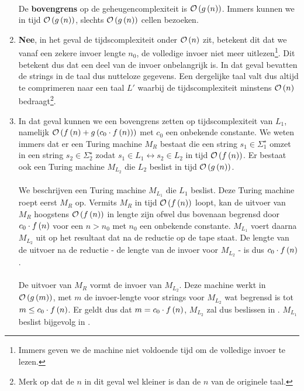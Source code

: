 \documentclass{article}
\begin{document}
\begin{question}[Complexiteitstheorie]
\begin{answer}
\begin{enumerate}
 \paragraph{}
 De \textbf{bovengrens} op de geheugencomplexiteit is $\mathcal{O}\left( g\left( n \right) \right)$. Immers kunnen we in tijd $\mathcal{O}\left( g\left( n \right) \right)$, slechts $\mathcal{O}\left( g\left( n \right) \right)$
 cellen bezoeken.
 \item \textbf{Nee}, in het geval de tijdscomplexiteit onder $\mathcal{O}\left( n \right)$ zit,
 betekent dit dat we vanaf een zekere invoer lengte $n_0$, de volledige invoer niet meer
 uitlezen\footnote{Immers geven we de machine niet voldoende tijd om de volledige invoer te lezen.}.
 Dit betekent dus dat een deel van de invoer onbelangrijk is. In dat geval bevatten de strings in de taal dus nutteloze gegevens.
 Een dergelijke taal valt dus altijd te comprimeren naar een taal $L'$ waarbij de tijdscomplexiteit minstens
 $\mathcal{O}\left( n \right)$ bedraagt\footnote{Merk op dat de $n$ in dit geval wel kleiner is dan de $n$ van de originele taal.}.
 \item In dat geval kunnen we een bovengrens zetten op tijdscomplexiteit van $L_1$,
 namelijk $\mathcal{O}\left( f\left( n \right)+g\left( c_0\cdot f\left( n \right) \right) \right)$ met $c_0$ een onbekende constante.
 We weten immers dat er een Turing machine $M_R$ bestaat die een string $s_1\in\Sigma_1^{\star}$ omzet
 in een string $s_2\in\Sigma_2^{\star}$ zodat $s_1\in L_1\leftrightarrow s_2\in L_2$ in tijd $\mathcal{O}\left( f\left( n \right) \right)$.
 Er bestaat ook een Turing machine $M_{L_2}$ die $L_2$ beslist in tijd $\mathcal{O}\left( g\left( n \right) \right)$.
 \paragraph{}
 We beschrijven een Turing machine $M_{L_1}$ die $L_1$ beslist. Deze Turing machine roept eerst $M_R$ op.
 Vermits $M_R$ in tijd $\mathcal{O}\left( f\left( n \right) \right)$ loopt, kan de uitvoer van $M_R$ hoogstens $\mathcal{O}\left( f\left( n \right) \right)$ in lengte
 zijn ofwel dus bovenaan begrensd door $c_0\cdot f\left( n \right)$ voor een $n>n_0$ met $n_0$ een onbekende constante.
 $M_{L_1}$ voert daarna $M_{L_2}$ uit op het resultaat dat na de reductie op de tape staat.
 De lengte van de uitvoer na de reductie - de lengte van de invoer voor $M_{L_2}$ - is dus $c_0\cdot f\left( n \right)$.
 
 \paragraph{}
 De uitvoer van $M_R$ vormt de invoer van $M_{L_2}$. Deze machine werkt in $\mathcal{O}\left( g\left( m \right) \right)$, met $m$ de invoer-lengte
 voor strings voor $M_{L_2}$ wat begrensd is tot $m\leq c_0\cdot f\left( n \right)$. Er geldt dus dat $m=c_0\cdot f\left( n \right)$, $M_{L_2}$ zal dus beslissen
 in . $M_{L_1}$ beslist bijgevolg in .
 

\end{enumerate}
\end{answer}
\end{question}
\end{document}
